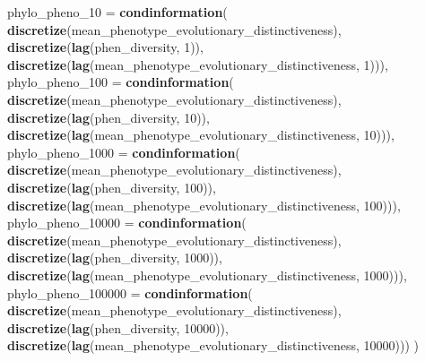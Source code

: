 \documentclass[]{book}
\newenvironment{Shaded}{\begin{snugshade}}{\end{snugshade}}
\newcommand{\DataTypeTok}[1]{\textcolor[rgb]{0.13,0.29,0.53}{#1}}
\newcommand{\DecValTok}[1]{\textcolor[rgb]{0.00,0.00,0.81}{#1}}
\newcommand{\KeywordTok}[1]{\textcolor[rgb]{0.13,0.29,0.53}{\textbf{#1}}}
\newcommand{\NormalTok}[1]{#1}
\begin{document}
\begin{Shaded}
\begin{Highlighting}[]
{  \DataTypeTok{phylo_pheno_10 =}     \KeywordTok{condinformation}\NormalTok{(}
                          \KeywordTok{discretize}\NormalTok{(mean_phenotype_evolutionary_distinctiveness),}
                          \KeywordTok{discretize}\NormalTok{(}\KeywordTok{lag}\NormalTok{(phen_diversity, }\DecValTok{1}\NormalTok{)),}
                          \KeywordTok{discretize}\NormalTok{(}\KeywordTok{lag}\NormalTok{(mean_phenotype_evolutionary_distinctiveness, }\DecValTok{1}\NormalTok{))),}
  \DataTypeTok{phylo_pheno_100 =}    \KeywordTok{condinformation}\NormalTok{(}
                          \KeywordTok{discretize}\NormalTok{(mean_phenotype_evolutionary_distinctiveness),}
                          \KeywordTok{discretize}\NormalTok{(}\KeywordTok{lag}\NormalTok{(phen_diversity, }\DecValTok{10}\NormalTok{)),}
                          \KeywordTok{discretize}\NormalTok{(}\KeywordTok{lag}\NormalTok{(mean_phenotype_evolutionary_distinctiveness, }\DecValTok{10}\NormalTok{))),}
  \DataTypeTok{phylo_pheno_1000 =}   \KeywordTok{condinformation}\NormalTok{(}
                          \KeywordTok{discretize}\NormalTok{(mean_phenotype_evolutionary_distinctiveness),}
                          \KeywordTok{discretize}\NormalTok{(}\KeywordTok{lag}\NormalTok{(phen_diversity, }\DecValTok{100}\NormalTok{)),}
                          \KeywordTok{discretize}\NormalTok{(}\KeywordTok{lag}\NormalTok{(mean_phenotype_evolutionary_distinctiveness, }\DecValTok{100}\NormalTok{))),}
  \DataTypeTok{phylo_pheno_10000 =}  \KeywordTok{condinformation}\NormalTok{(}
                          \KeywordTok{discretize}\NormalTok{(mean_phenotype_evolutionary_distinctiveness),}
                          \KeywordTok{discretize}\NormalTok{(}\KeywordTok{lag}\NormalTok{(phen_diversity, }\DecValTok{1000}\NormalTok{)),}
                          \KeywordTok{discretize}\NormalTok{(}\KeywordTok{lag}\NormalTok{(mean_phenotype_evolutionary_distinctiveness, }\DecValTok{1000}\NormalTok{))),}
  \DataTypeTok{phylo_pheno_100000 =} \KeywordTok{condinformation}\NormalTok{(}
                          \KeywordTok{discretize}\NormalTok{(mean_phenotype_evolutionary_distinctiveness),}
                          \KeywordTok{discretize}\NormalTok{(}\KeywordTok{lag}\NormalTok{(phen_diversity, }\DecValTok{10000}\NormalTok{)),}
                          \KeywordTok{discretize}\NormalTok{(}\KeywordTok{lag}\NormalTok{(mean_phenotype_evolutionary_distinctiveness, }\DecValTok{10000}\NormalTok{)))}
\NormalTok{)}

}
\end{Highlighting}
\end{Shaded}
\end{document}
